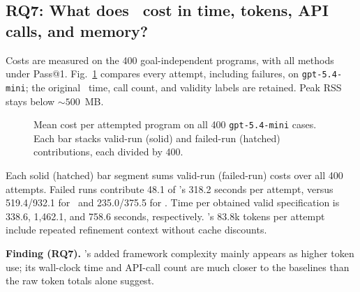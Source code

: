 
\subsection{RQ7: What does \toolname\ cost in time, tokens, API calls, and memory?}
\label{subsec:rq7-cost}

Costs are measured on the 400 goal-independent programs, with all methods
under Pass@1. {Fig.~\ref{fig:rq7-cost} compares every attempt, including
failures, on \texttt{gpt-5.4-mini}; the original \autospec\ time, call count,
and validity labels are retained.} Peak RSS stays below \(\sim 500\)~MB.

\begin{figure}[t]
\centering

\caption{{Mean cost per attempted program on all 400 \texttt{gpt-5.4-mini} cases. Each bar stacks valid-run (solid) and failed-run (hatched) contributions, each divided by 400.}}
\label{fig:rq7-cost}
\end{figure}

{Each solid (hatched) bar segment sums valid-run (failed-run) costs over
all 400 attempts. Failed runs contribute 48.1 of \toolname's 318.2 seconds
per attempt, versus 519.4/932.1 for \autospec\ and 235.0/375.5 for
\specgen. Time per obtained valid specification is 338.6, 1,462.1, and
758.6 seconds, respectively. \toolname's 83.8k tokens per attempt include
repeated refinement context without cache discounts.}

\begin{finding}
\textbf{Finding (RQ7).} {\toolname's added framework complexity mainly appears as higher token use; its wall-clock time and API-call count are much closer to the baselines than the raw token totals alone suggest.}
\end{finding}

